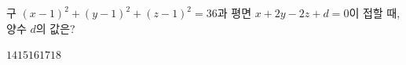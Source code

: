 구 $(x-1)^2+(y-1)^2+(z-1)^2=36$과 평면 $x+2y-2z+d=0$이 접할 때, 양수 $d$의 값은?
\begin{choices32}{$14$}{$15$}{$16$}{$17$}{$18$}\end{choices32}
